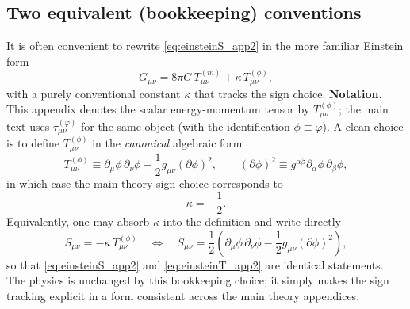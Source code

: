 \documentclass[11pt]{article}
\begin{document}
\subsection{Two equivalent (bookkeeping) conventions}
It is often convenient to rewrite \eqref{eq:einsteinS_app2} in the more familiar Einstein form
\begin{equation}
G_{\mu\nu}=8\pi G\,T^{(m)}_{\mu\nu}+\kappa\,T^{(\phi)}_{\mu\nu},
\label{eq:einsteinT_app2}
\end{equation}
with a purely conventional constant $\kappa$ that tracks
the sign choice.
\textbf{Notation.}  This appendix denotes the scalar
energy-momentum tensor by $T^{(\phi)}_{\mu\nu}$; the
main text uses $\tau^{(\varphi)}_{\mu\nu}$ for the same
object (with the identification $\phi \equiv \varphi$).
A clean choice is to define $T^{(\phi)}_{\mu\nu}$ in
the \emph{canonical} algebraic form
\begin{equation}
T^{(\phi)}_{\mu\nu}\equiv \partial_\mu\phi\,\partial_\nu\phi-\frac12 g_{\mu\nu}(\partial\phi)^2,
\qquad (\partial\phi)^2\equiv g^{\alpha\beta}\partial_\alpha\phi\,\partial_\beta\phi,
\label{eq:Tphi_canonical}
\end{equation}
in which case the main theory sign choice corresponds to
\begin{equation}
\kappa=-\frac12.
\label{eq:kappa}
\end{equation}
Equivalently, one may absorb $\kappa$ into the definition and write directly
\begin{equation}
S_{\mu\nu}= -\kappa\,T^{(\phi)}_{\mu\nu}
\quad\Longleftrightarrow\quad
S_{\mu\nu}=\frac12\left(\partial_\mu\phi\,\partial_\nu\phi-\frac12 g_{\mu\nu}(\partial\phi)^2\right),
\label{eq:Smunu_app2}
\end{equation}
so that \eqref{eq:einsteinS_app2} and \eqref{eq:einsteinT_app2} are identical statements.
The physics is unchanged by this bookkeeping choice; it simply makes the sign tracking explicit in a form consistent across the main theory appendices.
\end{document}
